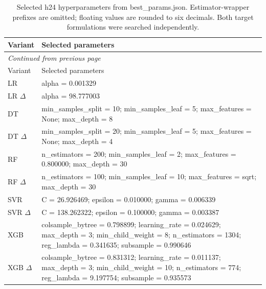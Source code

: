 \begingroup\small\setlength{\tabcolsep}{4pt}
\begin{longtable}{p{.16\linewidth}p{.76\linewidth}}
\caption{Selected h24 hyperparameters from best\_params.json. Estimator-wrapper prefixes are omitted; floating values are rounded to six decimals. Both target formulations were searched independently.}\label{tab:selected_h24}\\
\toprule
Variant & Selected parameters \\
\midrule\endfirsthead
\multicolumn{2}{l}{\small\itshape Continued from previous page}\\\toprule
Variant & Selected parameters \\
\midrule\endhead\bottomrule\endfoot
LR & alpha = \num{0.001329} \\
LR $\Delta$ & alpha = \num{98.777003} \\
DT & min\_samples\_split = 10; min\_samples\_leaf = 5; max\_features = None; max\_depth = 8 \\
DT $\Delta$ & min\_samples\_split = 20; min\_samples\_leaf = 5; max\_features = None; max\_depth = 4 \\
RF & n\_estimators = 200; min\_samples\_leaf = 2; max\_features = \num{0.800000}; max\_depth = 30 \\
RF $\Delta$ & n\_estimators = 100; min\_samples\_leaf = 10; max\_features = sqrt; max\_depth = 30 \\
SVR & C = \num{26.926469}; epsilon = \num{0.010000}; gamma = \num{0.006339} \\
SVR $\Delta$ & C = \num{138.262322}; epsilon = \num{0.100000}; gamma = \num{0.003387} \\
XGB & colsample\_bytree = \num{0.798899}; learning\_rate = \num{0.024629}; max\_depth = 3; min\_child\_weight = 8; n\_estimators = 1304; reg\_lambda = \num{0.341635}; subsample = \num{0.990646} \\
XGB $\Delta$ & colsample\_bytree = \num{0.831312}; learning\_rate = \num{0.011137}; max\_depth = 3; min\_child\_weight = 10; n\_estimators = 774; reg\_lambda = \num{9.197754}; subsample = \num{0.935573} \\
\end{longtable}\endgroup
